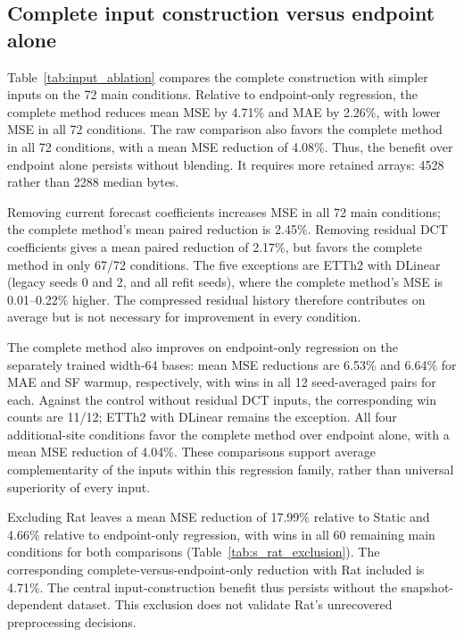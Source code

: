 \subsection{Complete input construction versus endpoint alone}
Table~\ref{tab:input_ablation} compares the complete construction with simpler inputs on the 72 main conditions. Relative to endpoint-only regression, the complete method reduces mean MSE by 4.71\% and MAE by 2.26\%, with lower MSE in all 72 conditions. The raw comparison also favors the complete method in all 72 conditions, with a mean MSE reduction of 4.08\%. Thus, the benefit over endpoint alone persists without blending. It requires more retained arrays: 4528 rather than 2288 median bytes.

Removing current forecast coefficients increases MSE in all 72 main conditions; the complete method's mean paired reduction is 2.45\%. Removing residual DCT coefficients gives a mean paired reduction of 2.17\%, but favors the complete method in only 67/72 conditions. The five exceptions are ETTh2 with DLinear (legacy seeds 0 and 2, and all refit seeds), where the complete method's MSE is 0.01--0.22\% higher. The compressed residual history therefore contributes on average but is not necessary for improvement in every condition.

The complete method also improves on endpoint-only regression on the separately trained width-64 bases: mean MSE reductions are 6.53\% and 6.64\% for MAE and SF warmup, respectively, with wins in all 12 seed-averaged pairs for each. Against the control without residual DCT inputs, the corresponding win counts are 11/12; ETTh2 with DLinear remains the exception. All four additional-site conditions favor the complete method over endpoint alone, with a mean MSE reduction of 4.04\%. These comparisons support average complementarity of the inputs within this regression family, rather than universal superiority of every input.

\begin{table}[!tbp]
\caption{Input ablations on the 72 main conditions. MSE and MAE columns are mean relative reductions from the same static base, not paired reductions from endpoint-only regression. Bytes are median retained arrays with global blending. All fitted regressions use four output DCT components and an intercept; endpoint persistence has no fitted regression.}
\label{tab:input_ablation}
\centering

\end{table}

Excluding Rat leaves a mean MSE reduction of 17.99\% relative to Static and 4.66\% relative to endpoint-only regression, with wins in all 60 remaining main conditions for both comparisons (Table~\ref{tab:s_rat_exclusion}). The corresponding complete-versus-endpoint-only reduction with Rat included is 4.71\%. The central input-construction benefit thus persists without the snapshot-dependent dataset. This exclusion does not validate Rat's unrecovered preprocessing decisions.

